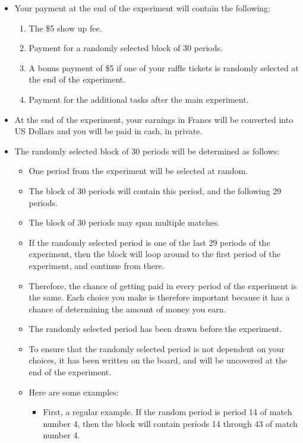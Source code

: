 \documentclass[11pt]{article}
\newcommand{\dblbkt}[1]{}
\begin{document}
\begin{itemize} 
\item \dblbkt{1} Your payment at the end of the experiment will contain the following:
\begin{enumerate} 
  \dblbkt{1} \item The \$5 show up fee.
  \dblbkt{1} \item Payment for a randomly selected block of 30 periods. 
  \dblbkt{1} \item A bonus payment of \$5 if one of your raffle tickets is randomly selected at the end of the experiment.
  \dblbkt{1} \item Payment for the additional tasks after the main experiment.
\end{enumerate} 
\item At the end of the experiment, \dblbkt{1} your earnings in Francs will be converted into US Dollars and you will be \dblbkt{1} paid in cash, in private.   
\item \dblbkt{3} The randomly selected block of 30 periods will be determined as follows:
\begin{itemize} 
  \item \dblbkt{1} One period from the experiment will be selected at random.  
  \item \dblbkt{1} The block of 30 periods will contain this period, and the following 29 periods.  
  \item \dblbkt{1} The block of 30 periods may span multiple matches.  
  \item \dblbkt{1} If the randomly selected period is one of the last 29 periods of the experiment, then the block will loop around to the first period of the experiment, and continue from there.  
  \item \dblbkt{1} Therefore, the chance of getting paid in every period of the experiment is the same. Each choice you make is therefore important because it has a chance of determining the amount of money you earn. 
  \item \dblbkt{1} The randomly selected period has been drawn before the experiment.  
  \item To ensure that the randomly selected period is not dependent on your choices, it has been written on the board, and will be uncovered at the end of the experiment. 
  \item \dblbkt{3} Here are some examples:
  \begin{itemize} 
    \item First, a regular example. \dblbkt{1} If the random period is period 14 of match number 4, \dblbkt{1} then the block will contain periods 14 through 43 of match number 4.

\end{itemize}
\end{itemize}
\end{itemize}
\end{document}
